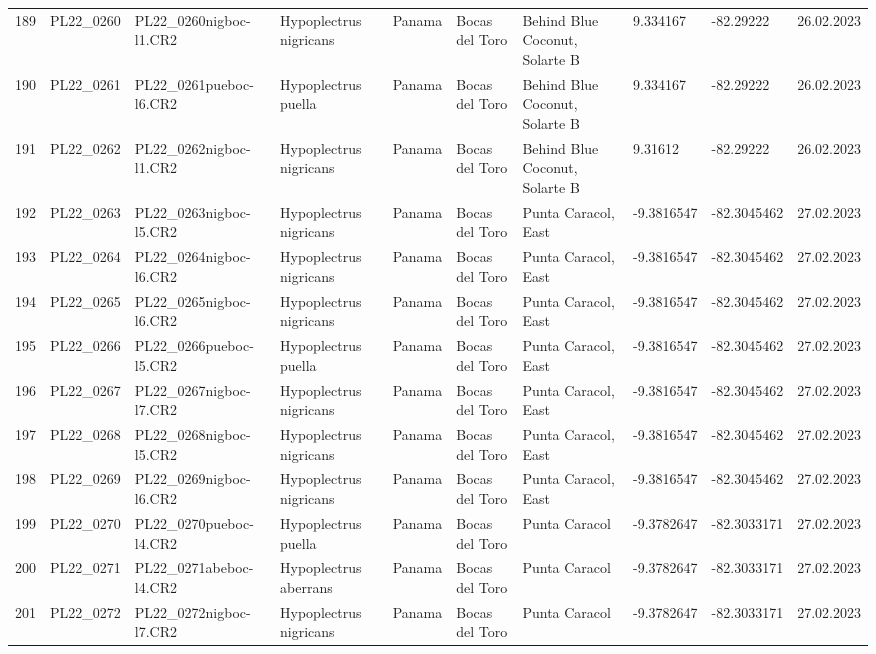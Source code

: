 \begin{table}[ht]
\begin{tabular}{rlllllllll}
  189 & PL22\_0260 & PL22\_0260nigboc-l1.CR2 & Hypoplectrus nigricans  & Panama & Bocas del Toro & Behind Blue Coconut, Solarte B & 9.334167 & -82.29222 & 26.02.2023 \\ 
  190 & PL22\_0261 & PL22\_0261pueboc-l6.CR2 & Hypoplectrus puella & Panama & Bocas del Toro & Behind Blue Coconut, Solarte B & 9.334167 & -82.29222 & 26.02.2023 \\ 
  191 & PL22\_0262 & PL22\_0262nigboc-l1.CR2 & Hypoplectrus nigricans  & Panama & Bocas del Toro & Behind Blue Coconut, Solarte B & 9.31612 & -82.29222 & 26.02.2023 \\ 
  192 & PL22\_0263 & PL22\_0263nigboc-l5.CR2 & Hypoplectrus nigricans  & Panama & Bocas del Toro & Punta Caracol, East & -9.3816547 & -82.3045462 & 27.02.2023 \\ 
  193 & PL22\_0264 & PL22\_0264nigboc-l6.CR2 & Hypoplectrus nigricans  & Panama & Bocas del Toro & Punta Caracol, East & -9.3816547 & -82.3045462 & 27.02.2023 \\ 
  194 & PL22\_0265 & PL22\_0265nigboc-l6.CR2 & Hypoplectrus nigricans  & Panama & Bocas del Toro & Punta Caracol, East & -9.3816547 & -82.3045462 & 27.02.2023 \\ 
  195 & PL22\_0266 & PL22\_0266pueboc-l5.CR2 & Hypoplectrus puella & Panama & Bocas del Toro & Punta Caracol, East & -9.3816547 & -82.3045462 & 27.02.2023 \\ 
  196 & PL22\_0267 & PL22\_0267nigboc-l7.CR2 & Hypoplectrus nigricans  & Panama & Bocas del Toro & Punta Caracol, East & -9.3816547 & -82.3045462 & 27.02.2023 \\ 
  197 & PL22\_0268 & PL22\_0268nigboc-l5.CR2 & Hypoplectrus nigricans  & Panama & Bocas del Toro & Punta Caracol, East & -9.3816547 & -82.3045462 & 27.02.2023 \\ 
  198 & PL22\_0269 & PL22\_0269nigboc-l6.CR2 & Hypoplectrus nigricans  & Panama & Bocas del Toro & Punta Caracol, East & -9.3816547 & -82.3045462 & 27.02.2023 \\ 
  199 & PL22\_0270 & PL22\_0270pueboc-l4.CR2 & Hypoplectrus puella & Panama & Bocas del Toro & Punta Caracol & -9.3782647 & -82.3033171 & 27.02.2023 \\ 
  200 & PL22\_0271 & PL22\_0271abeboc-l4.CR2 & Hypoplectrus aberrans & Panama & Bocas del Toro & Punta Caracol & -9.3782647 & -82.3033171 & 27.02.2023 \\ 
  201 & PL22\_0272 & PL22\_0272nigboc-l7.CR2 & Hypoplectrus nigricans  & Panama & Bocas del Toro & Punta Caracol & -9.3782647 & -82.3033171 & 27.02.2023 \\ 

\end{tabular}
\end{table}

